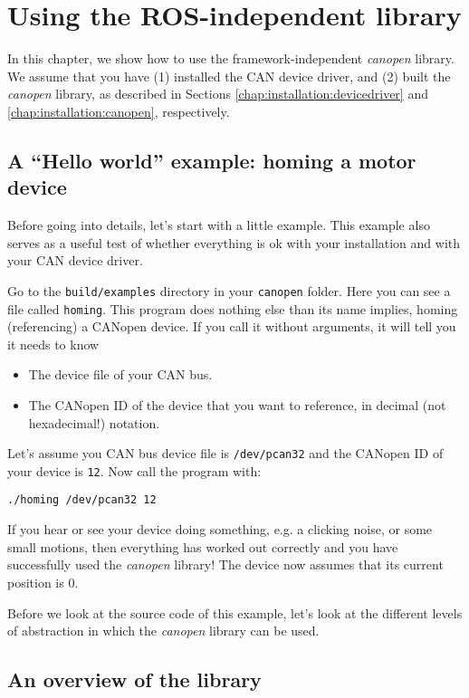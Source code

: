 \chapter{Using the ROS-independent library}
\label{chap:rosindependentlibrary}

In this chapter, we show how to use the framework-independent {\em canopen} library. We assume that you have (1) installed the CAN device driver, and (2) built the {\em canopen} library, as described in Sections \ref{chap:installation:devicedriver} and \ref{chap:installation:canopen}, respectively.

\section{A ``Hello world'' example: homing a motor device}

Before going into details, let's start with a little example. This example also serves as a useful test of whether everything is ok with your installation and with your CAN device driver.

Go to the \texttt{build/examples} directory in your \texttt{canopen} folder. Here you can see a file called \texttt{homing}. This program does nothing else than its name implies, homing (referencing) a CANopen device.
If you call it without arguments, it will tell you it needs to know
\begin{itemize}
\item The device file of your CAN bus.
\item The CANopen ID of the device that you want to reference, in decimal (not hexadecimal!) notation.
\end{itemize}

Let's assume you CAN bus device file is \texttt{/dev/pcan32} and the CANopen ID of your device is \texttt{12}. Now call the program with:
\begin{verbatim}
./homing /dev/pcan32 12
\end{verbatim}

If you hear or see your device doing something, e.g. a clicking noise, or some small motions, then everything has worked out correctly and you have successfully used the {\em canopen} library! The device now assumes that its current position is $0$.

Before we look at the source code of this example, let's look at the different levels of abstraction in which the {\em canopen} library can be used.

\section{An overview of the library}

